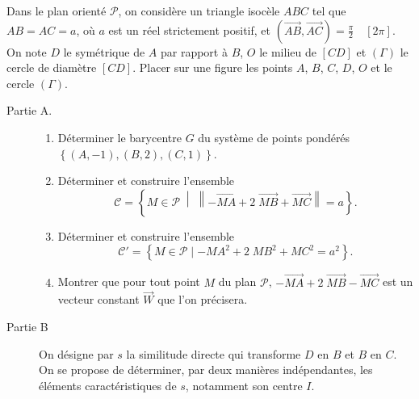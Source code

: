 \begin{exo}\label{exo:sim-triangle-isocele}
      Dans le plan orient\'e $\mathscr{P}$, on consid\`ere un triangle isoc\`ele $ABC$ tel que $AB = AC = a$, 
      o\`u $a$ est un r\'eel strictement positif, et $ \left( \overrightarrow{AB},\overrightarrow{AC} \right) = \frac{\pi}{2} \quad [2 \pi]$.
      On note $D$ le sym\'etrique de $A$ par rapport \`a $B$, $O$ le milieu de $[CD]$ et 
      $(\Gamma)$ le cercle de diam\`etre $[CD]$. 
      Placer sur une figure les points $A$, $B$, $C$, $D$, $O$ et le cercle $(\Gamma)$.       
      \begin{description}
            \item[Partie A.]
                  \begin{enumerate}
                        \item D\'eterminer le barycentre $G$ du syst\`eme de points pond\'er\'es 
                              $\left\lbrace (A,-1) , (B , 2) , (C , 1) \right\rbrace$.
	                        \item D\'eterminer et construire l'ensemble 
	                              \[
	                              \mathscr{C} = \left\lbrace M \in \mathscr{P} \;\middle|\; \left\| - 
	                              \overrightarrow{MA} + 2 \; \overrightarrow{MB} + \overrightarrow{MC} \right\| = a \right\rbrace.
	                              \]
	                        \item D\'eterminer et construire l'ensemble 
	                              \[
	                              \mathscr{C}' = \left\lbrace M \in \mathscr{P} \mid 
	                              -{MA}^2 + 2 \; {MB}^2 + {MC}^2 = a^2 \right\rbrace.
	                              \]
                        \item Montrer que pour tout point $M$ du plan 
                              $\mathscr{P}$, $-\overrightarrow{MA} + 2 \; \overrightarrow{MB} - \overrightarrow{MC}$ 
	                              est un vecteur constant $\overrightarrow{W}$ que l'on pr\'ecisera.
                  \end{enumerate}
            \item[Partie B]
                  On d\'esigne par $s$ la similitude directe qui transforme $D$ en $B$ et $B$ en $C$. 
                  On se propose de d\'eterminer, par deux mani\`eres ind\'ependantes, 
                  les \'el\'ements caract\'eristiques de $s$, notamment son centre $I$.
                  

\end{description}
\end{exo}
